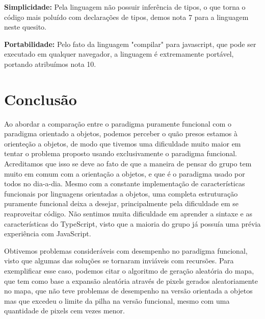 \documentclass[rel_mlp]{iiufrgs}
\numberwithin{figure}{chapter}
\begin{document}
\textbf{Simplicidade:} Pela linguagem não possuir inferência de tipos, o que torna o código mais poluído com declarações de tipos, demos nota 7 para a linguagem neste quesito.

\textbf{Portabilidade:} Pelo fato da linguagem "compilar" para javascript, que pode ser executado em qualquer navegador, a linguagem é extremamente portável, portando atribuímos nota 10.





%
\chapter{Conclusão}

Ao abordar a comparação entre o paradigma puramente funcional com o paradigma orientado a objetos, podemos perceber o quão presos estamos à orienteção a objetos, de modo que tivemos uma dificuldade muito maior em tentar o problema proposto usando exclusivamente o paradigma funcional. Acreditamos que isso se deve ao fato de que a maneira de pensar do grupo tem muito em comum com a orientação a objetos, e que é o paradigma usado por todos no dia-a-dia. Mesmo com a constante implementação de características funcionais por linguagens orientadas a objetos, uma completa estruturação puramente funcional deixa a desejar, principalmente pela dificuldade em se reaproveitar código. Não sentimos muita dificuldade em aprender a sintaxe e as características do TypeScript, visto que a maioria do grupo já possuía uma prévia experiência com JavaScript.

Obtivemos problemas consideráveis com desempenho no paradigma funcional, visto que algumas das soluções se tornaram inviáveis com recursões. Para exemplificar esse caso, podemos citar o algoritmo de geração aleatória do mapa, que tem como base a expansão aleatória através de pixels gerados aleatoriamente no mapa, que não teve problemas de desempenho na versão orientada a objetos mas que excedeu o limite da pilha na versão funcional, mesmo com uma quantidade de pixels cem vezes menor.


%

%




\end{document}
